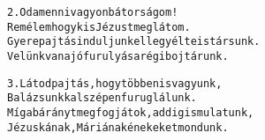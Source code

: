 \begin{minipage}{\textwidth}
\kottastart
{}
\kottaend
\begin{minipage}{\textwidth}
\begin{alltt}
2. Odamenni vagyon bátorságom!
   Remélem hogy kis Jézust meglátom.
   Gyere pajtás induljunk el legyél te is társunk.
   Velünk van a jó furulyás a régi bojtárunk.
\end{alltt}
\vspace{0.0cm}
\versszakspacing
\end{minipage}
\begin{minipage}{\textwidth}
\begin{alltt}
3. Látod pajtás, hogy többen is vagyunk,
   Balázsunkkal szépen furuglálunk.
   Míg a bárányt megfogjátok, addig is mulatunk,
   Jézuskának, Máriának énekeket mondunk.
\end{alltt}
\vspace{0.0cm}
\versszakspacing
\end{minipage}
\end{minipage}
~\vspace{1.0cm}
\newline
